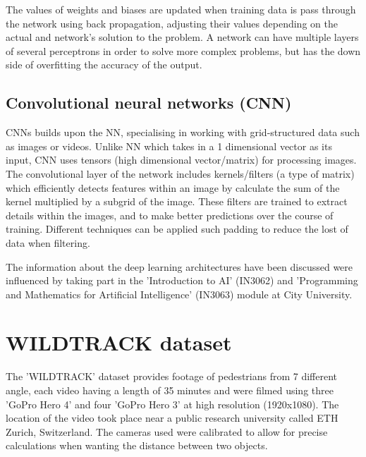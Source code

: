 \documentclass[12pt]{report}
\begin{document}
\vspace{5 mm}

The values of weights and biases are updated when training data is pass through the network using back propagation, adjusting their values depending on the actual and network's solution to the problem. A network can have multiple layers of several perceptrons in order to solve more complex problems, but has the down side of overfitting the accuracy of the output.


\subsection{Convolutional neural networks (CNN)}

CNNs builds upon the NN, specialising in working with grid-structured data such as images or videos. Unlike NN which takes in a 1 dimensional vector as its input, CNN uses tensors (high dimensional vector/matrix) for processing images. The convolutional layer of the network includes kernels/filters (a type of matrix) which efficiently detects features within an image by calculate the sum of the kernel multiplied by a subgrid of the image. These filters are trained to extract details within the images, and to make better predictions over the course of training. Different techniques can be applied such padding to reduce the lost of data when filtering.

\vspace{2mm}

The information about the deep learning architectures have been discussed were influenced by taking part in the 'Introduction to AI' (IN3062) and 'Programming and Mathematics for Artificial Intelligence' (IN3063) module at City University.

\section{WILDTRACK dataset}

The 'WILDTRACK' dataset provides footage of pedestrians from 7 different angle, each video having a length of 35 minutes and were filmed using three 'GoPro Hero 4' and four 'GoPro Hero 3' at high resolution (1920x1080). The location of the video took place near a public research university called ETH Zurich, Switzerland. The cameras used were calibrated to allow for precise calculations when wanting the distance between two objects.

\vspace{2mm}
\end{document}
